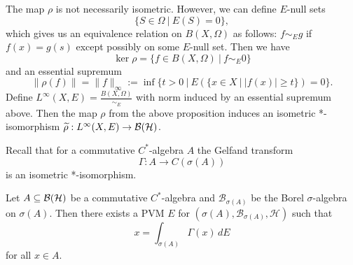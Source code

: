 \begin{remark}
  The map $\rho$ is not necessarily isometric.
  However, we can define $E$-null sets 
  $$\{S \in \Omega\ |\ E(S) = 0\},$$
  which gives us an equivalence relation on $B(X, \Omega)$ as follows:
  $f \sim_E g$ if $f(x) = g(s)$ except possibly on some $E$-null set.
  Then we have 
  $$\ker \rho = \{f \in B (X, \Omega)\ |\ f \sim_E 0\}$$ and an essential supremum
  $$\|\rho (f)\| = \| f\|_{\infty} := \inf \{t > 0\ |\ E(\{x \in X\ |\ |f(x)| \geq t\}) = 0\}.$$
  Define $L^\infty (X, E) = \frac{B(X, \Omega)}{\sim_E}$ with norm induced by an essential supremum above.
  Then the map $\rho$ from the above proposition induces an isometric *-isomorphism $\widetilde{\rho}: L^\infty (X, E) \to \operatorname{\mathcal{B} (\mathcal{H})}$.
\end{remark}

Recall that for a commutative $C^*$-algebra $A$ the Gelfand transform 
$$\Gamma: A \to {C} (\sigma(A))$$
is an isometric *-isomorphism.

\begin{theorem}\label{thm:1}
  Let $A \subseteq \operatorname{\mathcal{B} (\mathcal{H})}$ be a commutative $C^*$-algebra and 
  $\mathcal{B}_{\sigma(A)}$ be the Borel $\sigma$-algebra on $\sigma(A)$.
  Then there exists a PVM $E$ for $(\sigma(A), \mathcal{B}_{\sigma(A)}, \mathcal{H})$ such that 
  $$x = \int_{\sigma(A)} \Gamma (x)\, dE$$
  for all $x \in A$.
\end{theorem}

